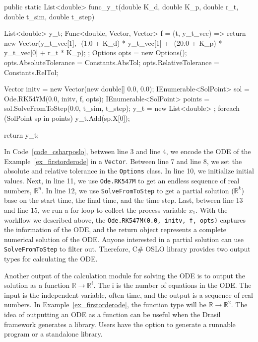 \begin{listing}[ht]
\begin{csharp1}
public static List<double> func_y_t(double K_d, double K_p, double r_t, double t_sim, double t_step) {
    List<double> y_t;
    Func<double, Vector, Vector> f = (t, y_t_vec) => {
        return new Vector(y_t_vec[1], -(1.0 + K_d) * y_t_vec[1] + -(20.0 + K_p) * y_t_vec[0] + r_t * K_p);
    };
    Options opts = new Options();
    opts.AbsoluteTolerance = Constants.AbsTol;
    opts.RelativeTolerance = Constants.RelTol;
    
    Vector initv = new Vector(new double[] {0.0, 0.0});
    IEnumerable<SolPoint> sol = Ode.RK547M(0.0, initv, f, opts);
    IEnumerable<SolPoint> points = sol.SolveFromToStep(0.0, t_sim, t_step);
    y_t = new List<double> {};
    foreach (SolPoint sp in points) {
        y_t.Add(sp.X[0]);
    }
    
    return y_t;
}
\end{csharp1}
\label{code_csharposlo}
\end{listing}

In Code~\ref{code_csharposlo}, between line 3 and line 4, we encode the ODE of the Example~\ref{ex_firstorderode} in a \verb|Vector|. Between line 7 and line 8, we set the absolute and relative tolerance in the \verb|Options| class. In line 10, we initialize initial values. Next, in line 11, we use \verb|Ode.RK547M| to get an endless sequence of real numbers, $\mathbb{R}^n$. In line 12, we use \verb|SolveFromToStep| to get a partial solution ($\mathbb{R}^k$) base on the start time, the final time, and the time step. Last, between line 13 and line 15, we run a for loop to collect the process variable $x_1$. With the workflow we described above, the \verb|Ode.RK547M(0.0, initv, f, opts)| captures the information of the ODE, and the return object represents a complete numerical solution of the ODE. Anyone interested in a partial solution can use \verb|SolveFromToStep| to filter out. Therefore, C\# OSLO library provides two output types for calculating the ODE.

Another output of the calculation module for solving the ODE is to output the solution as a function $\mathbb{R} \rightarrow \mathbb{R}^i$. The i is the number of equations in the ODE. The input is the independent variable, often time, and the output is a sequence of real numbers. In Example~\ref{ex_firstorderode}, the function type will be $\mathbb{R} \rightarrow \mathbb{R}^2$. The idea of outputting an ODE as a function can be useful when the Drasil framework generates a library. Users have the option to generate a runnable program or a standalone library. 

